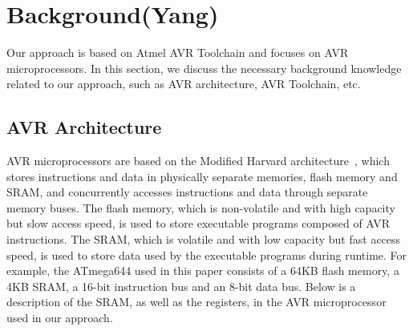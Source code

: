 \section{Background(Yang)}\label{sec:background}
Our approach is based on Atmel AVR Toolchain and focuses on AVR microprocessors. In this section, we discuss the necessary background knowledge related to our approach, such as AVR architecture, AVR Toolchain, etc.


\subsection{AVR Architecture}
AVR microprocessors are based on the Modified Harvard architecture~\cite{argade1996apparatus}, which stores instructions and data in physically separate memories, flash memory and SRAM, and concurrently accesses instructions and data through separate memory buses. The flash memory, which is non-volatile and with high capacity but slow access speed, is used to store executable programs composed of AVR instructions. The SRAM, which is volatile and with low capacity but fast access speed, is used to store data used by the executable programs during runtime. For example, the ATmega644 used in this paper consists of a 64KB flash memory, a 4KB SRAM, a 16-bit instruction bus and an 8-bit data bus. Below is a description of the SRAM, as well as the registers, in the AVR microprocessor used in our approach.


